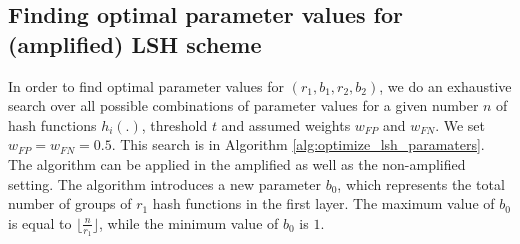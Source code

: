 \subsection{Finding optimal parameter values for (amplified) LSH scheme}
In order to find optimal parameter values for $(r_1,b_1,r_2,b_2)$, we do an exhaustive search over all possible combinations of parameter values for a given number $n$ of hash functions $h_i(.)$, threshold $t$ and assumed weights $w_{FP}$ and $w_{FN}$. We set $w_{FP} = w_{FN} = 0.5$. This search is in Algorithm \ref{alg:optimize_lsh_paramaters}. The algorithm can be applied in  the amplified as well as the non-amplified setting. The algorithm introduces a new parameter $b_0$, which represents the total number of groups of $r_1$ hash functions in the first layer. The maximum value of $b_0$ is equal to $\lfloor \frac{n}{r_1} \rfloor$, while the minimum value of $b_0$ is $1$.

